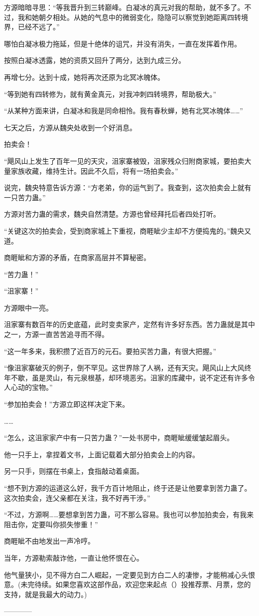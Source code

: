 \begin{this_body}
方源暗暗寻思：“等我晋升到三转巅峰。白凝冰的真元对我的帮助，就不多了。不过，我和她朝夕相处。从她的气息中的微弱变化，隐隐可以察觉到她距离四转境界，已经不远了。”

哪怕白凝冰极力拖延，但是十绝体的诅咒，并没有消失，一直在发挥着作用。

按照白凝冰透露，她的资质又回升了两分，达到九成三分。

再增七分。达到十成，她将再次还原为北冥冰魄体。

“等到她有四转修为，就有黄金真元，对我冲刺四转境界，帮助极大。”

“从某种方面来讲，白凝冰和我是同命相怜。我有春秋蝉，她有北冥冰魄体……”

七天之后，方源从魏央处收到一个好消息。

拍卖会！

“飓风山上发生了百年一见的天灾，沮家寨被毁，沮家残众归附商家城，要拍卖大量家族收藏，维持生计。因此不久后，将有一场拍卖会。”

说完，魏央特意告诉方源：“方老弟，你的运气到了。我查到，这次拍卖会上就有一只苦力蛊。”

方源对苦力蛊的需求，魏央自然清楚。方源也曾经拜托后者四处打听。

“关键这次的拍卖会，受到商家城上下重视，商睚眦少主却不方便捣鬼的。”魏央又道。

商睚眦和方源的矛盾，在商家高层并不算秘密。

“苦力蛊！”

“沮家寨！”

方源眼中一亮。

沮家寨有数百年的历史底蕴，此时变卖家产，定然有许多好东西。苦力蛊就是其中之一，方源一直苦苦追寻而不得。

“这一年多来，我积攒了近百万的元石。要拍买苦力蛊，有很大把握。”

“像沮家寨破灭的例子，倒不罕见。这世界除了人祸，还有天灾。飓风山上大风终年不歇，虽是灵山，有元泉根基，却环境恶劣。沮家的库藏中，说不定还有许多令人心动的宝物。”

“参加拍卖会！”方源立即这样决定下来。

……

“怎么，这沮家家产中有一只苦力蛊？”一处书房中，商睚眦缓缓皱起眉头。

他一只手上，拿捏着文书，上面记载着大部分拍卖会上的内容。

另一只手，则摆在书桌上，食指敲动着桌面。

“想不到方源的运道这么好，我千方百计地阻止，终于还是让他要拿到苦力蛊了。这次拍卖会，连父亲都在关注，我不好再干涉。”

“不过，方源啊……要想拿到苦力蛊，可不那么容易。我也可以参加拍卖会，有我来阻击你，定要叫你损失惨重！”

商睚眦不由地发出一声冷哼。

当年，方源勒索敲诈他，一直让他怀恨在心。

他气量狭小，见不得方白二人崛起，一定要见到方白二人的凄惨，才能稍减心头恨意。(未完待续。如果您喜欢这部作品，欢迎您来起点（）投推荐票、月票，您的支持，就是我最大的动力。)

------------

\end{this_body}

